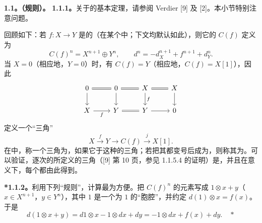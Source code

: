 \textbf{1.1。（规则）。}
\textbf{1.1.1。}关于的基本定理，请参阅 Verdier [9] 及 [2]。本小节特别注意问题。

回顾如下：若 $f:X\to Y$ 是的（在某个中；下文均默认如此），则它的 $C(f)$ 定义为
\[
C(f)^n=X^{n+1}\oplus Y^n,\qquad d^n=-d_X^{n+1}+f^{n+1}+d_Y^n.\tag{1.1.1.1}
\]
当 $X=0$（相应地，$Y=0$）时，有 $C(f)=Y$（相应地，$C(f)=X[1]$），因此
\[
\begin{tikzcd}
0\arrow[r,equal]\arrow[d]&0\arrow[r,equal]\arrow[d]&X\arrow[r,equal]\arrow[d,"f"]&X\arrow[d]\\
X\arrow[r,"f"']&Y\arrow[r,equal]&Y\arrow[r]&0
\end{tikzcd}
\]
定义一个“三角”
\[
X\xrightarrow{f}Y\longrightarrow C(f)\xrightarrow{j}X[1].
\]
在中，称一个三角为，如果它于这种的三角；若把其都变号后成为，则称其为。可以验证，逐次的所定义的三角（[9] 第 10 页，参见 1.1.5.4 的证明）是，并且在意义下，每个都由此得到。

\textbf{*1.1.2。}利用下列“规则”，计算最为方便。把 $C(f)^n$ 的元素写成 $1\otimes x+y$（$x\in X^{n+1}$，$y\in Y^n$），其中 $1$ 是一个为 $1$ 的“胞腔”，并约定 $d(1)\otimes x=f(x)$。于是
\[
d(1\otimes x+y)=d1\otimes x-1\otimes dx+dy=-1\otimes dx+f(x)+dy.\quad *
\]

